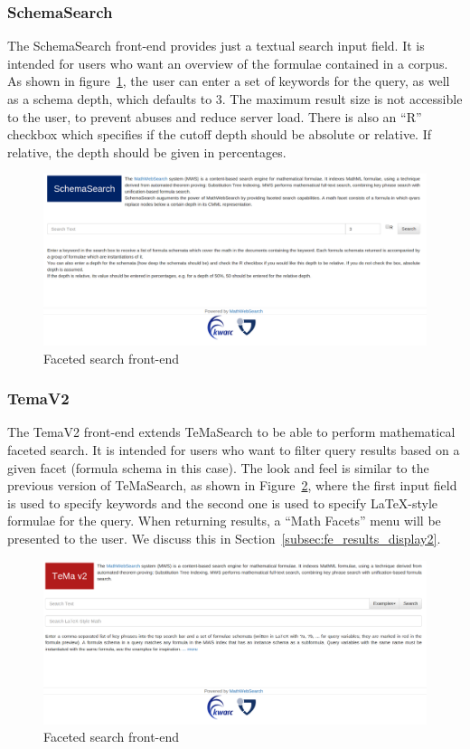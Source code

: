 \documentclass[a4paper,oneside]{article}
\def\tms{\textsf{TeMaSearch}\xspace}
\def\latex{\LaTeX\xspace}
\begin{document}
\subsubsection{SchemaSearch}
The \textsf{SchemaSearch} front-end provides just a textual search input field.
It is intended for users who want an overview of the formulae contained in a
corpus.
As shown in figure~\ref{fig:frontend_schema}, the user can enter a set of keywords for
the query, as well as a schema depth, which defaults to 3. The maximum result
size is not accessible to the user, to prevent abuses and reduce server load.
There is also an ``R'' checkbox which specifies if the cutoff depth should be
absolute or relative. If relative, the depth should be given in percentages.

\begin{figure}[ht]\centering
    \includegraphics[width=12.8cm]{img/frontend_schema.png}
    \caption{Faceted search front-end}\label{fig:frontend_schema}
\end{figure}
\FloatBarrier

\subsubsection{TemaV2}
The \textsf{TemaV2} front-end extends \tms to be able to perform mathematical
faceted search. It is intended for users who want to filter query results based
on a given facet (formula schema in this case).
The look and feel is similar to the previous version of \tms,
as shown in Figure~\ref{fig:frontend_temaV2}, where the first input field is
used to specify keywords and the second one is used to specify \latex-style
formulae for the query. When returning results, a ``Math Facets'' menu will be
presented to the user. We discuss this in
Section~\ref{subsec:fe_results_display2}.

\begin{figure}[ht]\centering
    \includegraphics[width=12.8cm]{img/frontend_temaV2.png}
    \caption{Faceted search front-end}\label{fig:frontend_temaV2}
\end{figure}
\FloatBarrier
\end{document}
